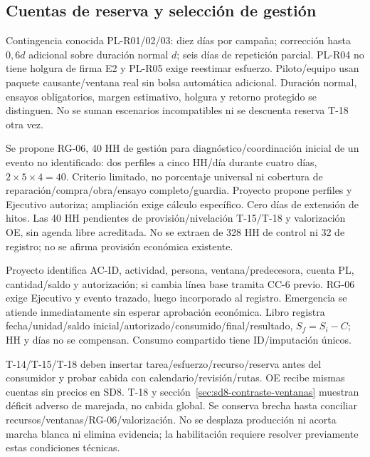 \subsection{Cuentas de reserva y selección de gestión}\label{sec:sd8-reservas-p06}
Contingencia conocida PL-R01/02/03: diez días por campaña; corrección hasta $0{,}6d$ adicional sobre duración normal $d$; seis días de repetición parcial. PL-R04 no tiene holgura de firma E2 y PL-R05 exige reestimar esfuerzo. Piloto/equipo usan paquete causante/ventana real sin bolsa automática adicional. Duración normal, ensayos obligatorios, margen estimativo, holgura y retorno protegido se distinguen. No se suman escenarios incompatibles ni se descuenta reserva T-18 otra vez.

Se propone RG-06, 40 HH de gestión para diagnóstico/coordinación inicial de un evento no identificado: dos perfiles a cinco HH/día durante cuatro días, $2\times5\times4=40$. Criterio limitado, no porcentaje universal ni cobertura de reparación/compra/obra/ensayo completo/guardia. Proyecto propone perfiles y Ejecutivo autoriza; ampliación exige cálculo específico. Cero días de extensión de hitos. Las 40 HH pendientes de provisión/nivelación T-15/T-18 y valorización OE, sin agenda libre acreditada. No se extraen de 328 HH de control ni 32 de registro; no se afirma provisión económica existente.

Proyecto identifica AC-ID, actividad, persona, ventana/predecesora, cuenta PL, cantidad/saldo y autorización; si cambia línea base tramita CC-6 previo. RG-06 exige Ejecutivo y evento trazado, luego incorporado al registro. Emergencia se atiende inmediatamente sin esperar aprobación económica. Libro registra fecha/unidad/saldo inicial/autorizado/consumido/final/resultado, $S_f=S_i-C$; HH y días no se compensan. Consumo compartido tiene ID/imputación únicos.

T-14/T-15/T-18 deben insertar tarea/esfuerzo/recurso/reserva antes del consumidor y probar cabida con calendario/revisión/rutas. OE recibe mismas cuentas sin precios en SD8. T-18 y sección~\ref{sec:sd8-contraste-ventanas} muestran déficit adverso de marejada, no cabida global. Se conserva brecha hasta conciliar recursos/ventanas/RG-06/valorización. No se desplaza producción ni acorta marcha blanca ni elimina evidencia; la habilitación requiere resolver previamente estas condiciones técnicas. \parencites[arts.~17,50.2 y72; pp.~12--13, 29, 38]{sd8-ba}[8.3]{sd8-ex}
